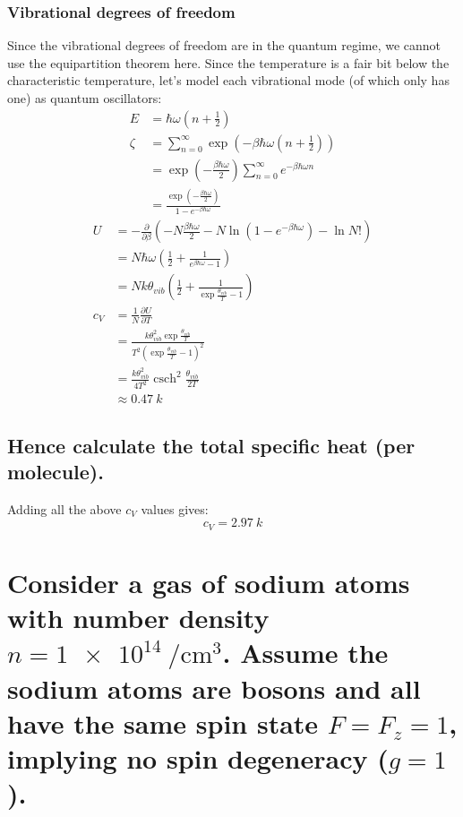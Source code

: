 \documentclass[a4paper]{scrartcl}
\begin{document}
\subsubsection{Vibrational degrees of freedom}
Since the vibrational degrees of freedom are in the quantum regime, we cannot use the equipartition theorem here. Since the temperature is a fair bit below the characteristic temperature, let's model each vibrational mode (of which  only has one) as quantum oscillators:
\begin{align*}
    E &= \hbar \omega (n + \frac{1}{2}) \\
    \zeta &= \sum_{n = 0}^\infty \exp\left(-\beta \hbar \omega (n + \frac{1}{2})\right) \\
    &= \exp\left(-\frac{\beta \hbar \omega}{2}\right) \sum_{n = 0}^\infty e^{-\beta \hbar \omega n} \\
    &= \frac{\exp\left(-\frac{\beta \hbar \omega}{2}\right)}{1 - e^{-\beta \hbar \omega}}
\end{align*}
\begin{align*}
    U &= -\frac{\partial}{\partial \beta} \left(-N \frac{\beta \hbar \omega}{2} - N \ln\left(1 - e^{-\beta \hbar \omega}\right) - \ln N!\right) \\
    &= N \hbar \omega \left(\frac{1}{2} + \frac{1}{e^{\beta \hbar \omega} - 1}\right) \\
    &= N k \theta_{vib} \left(\frac{1}{2} + \frac{1}{\exp \frac{\theta_{vib}}{T} - 1}\right) \\
    c_V &= \frac{1}{N} \frac{\partial U}{\partial T} \\
    &= \frac{k \theta_{vib}^2 \exp \frac{\theta_{vib}}{T}}{T^2 \left(\exp \frac{\theta_{vib}}{T} - 1\right)^2} \\
    &= \frac{k \theta_{vib}^2}{4 T^2} \operatorname{csch}^2 \frac{\theta_{vib}}{2 T} \\
    &\approx 0.47\: k
\end{align*}

\subsection{Hence calculate the total specific heat (per molecule).}
Adding all the above \(c_V\) values gives:
\[c_V = 2.97\: k\]

\section{Consider a gas of sodium atoms with number density \(n = \SI{1e14}{\per\centi\metre\cubed}\). Assume the sodium atoms are bosons and all have the same spin state \(F = F_z = 1\), implying no spin degeneracy (\(g = 1\)).}
\end{document}
